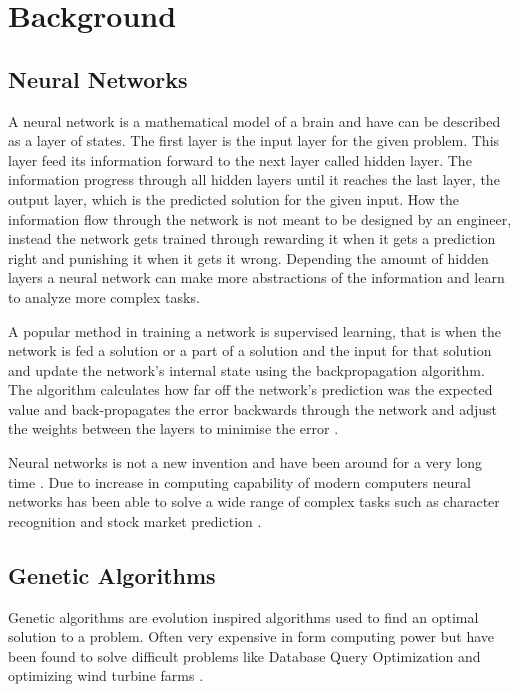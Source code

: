 \documentclass{kththesis}
\begin{document}
\chapter{Background}

\section{Neural Networks}
A neural network is a mathematical model of a brain and have can be described as a layer of states. The first layer is the input layer for the given problem. This layer feed its information forward to the next layer called hidden layer. The information progress through all hidden layers until it reaches the last layer, the output layer, which is the predicted solution for the given input. How the information flow through the network is not meant to be designed by an engineer, instead the network gets trained through rewarding it when it gets a prediction right and punishing it when it gets it wrong. Depending the amount of hidden layers a neural network can make more abstractions of the information and learn to analyze more complex tasks.

A popular method in training a network is supervised learning, that is when the network is fed a solution or a part of a solution and the input for that solution and update the network's internal state using the backpropagation algorithm. The algorithm calculates how far off the network’s prediction was the expected value and back-propagates the error backwards through the network and adjust the weights between the layers to minimise the error \parencite{BackProp}\parencite{Applications_backpropagation}.

Neural networks is not a new invention and have been around for a very long time \parencite{NNHistory}. Due to increase in computing capability of modern computers neural networks has been able to solve a wide range of complex tasks such as character recognition and stock market prediction \parencite{NNHistory2}.


\section{Genetic Algorithms}
Genetic algorithms are evolution inspired algorithms used to find an optimal solution to a problem. Often very expensive in form computing power but have been found to solve difficult problems like Database Query Optimization \parencite{bennett1991genetic} and optimizing wind turbine farms \parencite{mosetti1994optimization}.
\end{document}
